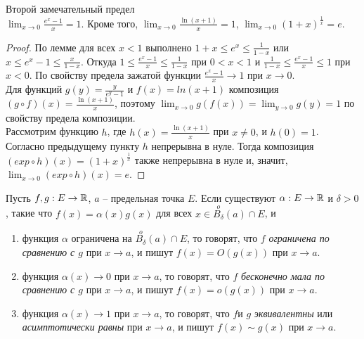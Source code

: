     \begin{lemma}{Второй замечательный предел}\\
        $\lim_{x \to 0} \frac{e^{x} - 1}{x} = 1$. Кроме того, $\lim_{x \to 0} \frac{\ln(x + 1)}{x} = 1$, $\lim_{x \to 0} (1 + x)^{\frac{1}{x}} = e$.
    \end{lemma}

    \begin{proof}
        По лемме для всех $x < 1$ выполнено $1 + x \leq e^{x} \leq \frac{1}{1 - x}$ или $x \leq e^{x} - 1 \leq \frac{x}{1 - x}$. Откуда $1 \leq \frac{e^{x} - 1}{x} \leq \frac{1}{1 - x}$ при $0 < x < 1$ и $\frac{1}{1 - x} \leq \frac{e^{x} - 1}{x} \leq 1$ при $x < 0$. По свойству предела зажатой функции $\frac{e^{x} - 1}{x} \to 1$ при $x \to 0$.\\
        Для функций $g(y) = \frac{y}{e^{y} - 1}$ и $f(x) = ln(x + 1)$ композиция $(g\circ f)(x) = \frac{\ln(x + 1)}{x}$, поэтому $\lim_{x \to 0}g(f(x)) = \lim_{y \to 0}g(y) = 1$ по свойству предела композиции.\\
        Рассмотрим функцию $h$, где $h(x) = \frac{\ln(x + 1)}{x}$ при $x \neq 0$, и $h(0) = 1$. Согласно предыдущему пункту $h$ непрерывна в нуле. Тогда композиция $(exp\circ h)(x) = (1 + x)^{\frac{1}{x}}$ также непрерывна в нуле и, значит, $\lim_{x \to 0} (exp\circ h)(x) = e$.
    \end{proof}

    \begin{definition}
        Пусть $f, g: E \to \mathbb{R}$, $a$ -- предельная точка $E$. Если существуют $\alpha: E \to \mathbb{R}$ и $\delta > 0$, такие что $f(x) = \alpha(x)g(x)$ для всех $x \in \overset{o}{B_{\delta}}(a) \cap E$, и
        \begin{enumerate}
            \item функция $\alpha$ ограничена на $\overset{o}{B_{\delta}}(a) \cap E$, то говорят, что $f$ \textit{ограничена по сравнению с $g$} при $x \to a$, и пишут $f(x) = O(g(x))$ при $x \to a$.
            \item функция $\alpha(x) \to 0$ при $x \to a$, то говорят, что $f$ \textit{бесконечно мала по сравнению с $g$} при $x \to a$, и пишут $f(x) = o(g(x))$ при $x \to a$.
            \item функция $\alpha(x) \to 1$ при $x \to a$, то говорят, что $f$и $g$ \textit{эквивалентны} или \textit{асимптотически равны} при $x \to a$, и пишут $f(x) \sim g(x)$ при $x \to a$.
        \end{enumerate}
    \end{definition}

